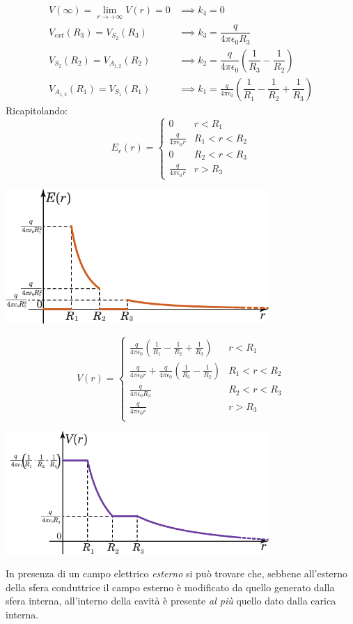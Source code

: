 \begin{align*}
		V(\infty)\displaystyle=\lim_{r\to+\infty}V(r)=0&\implies k_4=0\\
		V_{ext}(R_3)=V_{S_2}(R_3)&\implies k_3=\dfrac{q}{4\pi\epsilon_0R_3}\\
		V_{S_2}(R_2)=V_{A_{1,2}}(R_2)&\implies k_2=\dfrac{q}{4\pi\epsilon_0}\left(\dfrac{1}{R_3}-\dfrac{1}{R_2}\right)\\
		V_{A_{1,2}}(R_1)=V_{S_1}(R_1)&\implies k_1=\frac{q}{4\pi\epsilon_0}\left(\dfrac{1}{R_1}-\dfrac{1}{R_2}+\dfrac{1}{R_3}\right)
\end{align*}
Ricapitolando:
\begin{equation*}
	E_{r}(r)=\begin{cases}
		0 & r<R_1\\
		\frac{q}{4\pi\epsilon_0r} & R_1<r<R_2\\
		0 & R_2<r<R_3\\
		\frac{q}{4\pi\epsilon_0 r} & r>R_3
	\end{cases}
\end{equation*}
\begin{center}
	\includegraphics[width=0.75\textwidth]{images/chp4/chp4sferacava2graf1.pdf}
\end{center}
\begin{equation*}
	V(r)=\begin{cases}
		\frac{q}{4\pi\epsilon_0}\left(\frac{1}{R_1}-\frac{1}{R_2}+\frac{1}{R_3}\right) & r<R_1\\
		\frac{q}{4\pi\epsilon_0r}+\frac{q}{4\pi\epsilon_0}\left(\frac{1}{R_3}-\frac{1}{R_2}\right) & R_1<r<R_2\\
		\frac{q}{4\pi\epsilon_0R_3} & R_2<r<R_3\\
		\frac{q}{4\pi\epsilon_0r} & r>R_3\\
	\end{cases}
\end{equation*}
\begin{center}
	\includegraphics[width=0.75\textwidth]{images/chp4/chp4sferacava2graf2.pdf}
\end{center}
In presenza di un campo elettrico \textit{esterno} si può trovare che, sebbene all'esterno della sfera conduttrice il campo esterno è modificato da quello generato dalla sfera interna, all'interno della cavità è presente \textit{al più} quello dato dalla carica interna.
